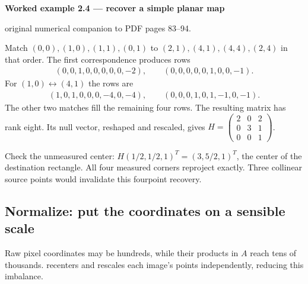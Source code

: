 \documentclass[letterpaper,11pt,english,openany,oneside]{jupyterBook}
\begin{document}
\label{\detokenize{lectures/lecture02/estimation:ex-lec02-dlt}}
\begin{TextbookBox}
\textbf{Worked example 2.4 — recover a simple planar map}\par\smallskip

\sphinxAtStartPar
{} original numerical companion to PDF pages 83–94.

\sphinxAtStartPar
Match \((0,0),(1,0),(1,1),(0,1)\) to \((2,1),(4,1),(4,4),(2,4)\) in that order. The first correspondence produces rows
\begin{equation*}
\begin{split}
(0,0,1,0,0,0,0,0,-2),\qquad
(0,0,0,0,0,1,0,0,-1).
\end{split}
\end{equation*}
\sphinxAtStartPar
For \((1,0)\leftrightarrow(4,1)\) the rows are
\begin{equation*}
\begin{split}
(1,0,1,0,0,0,-4,0,-4),\qquad
(0,0,0,1,0,1,-1,0,-1).
\end{split}
\end{equation*}
\sphinxAtStartPar
The other two matches fill the remaining four rows. The resulting matrix has rank eight. Its null vector, reshaped and rescaled, gives
\(H=\begin{pmatrix}2&0&2\\0&3&1\\0&0&1\end{pmatrix}\).

\sphinxAtStartPar
Check the unmeasured center: \(H(1/2,1/2,1)^T=(3,5/2,1)^T\), the center of the destination rectangle. All four measured corners reproject exactly. Three collinear source points would invalidate this four\sphinxhyphen{}point recovery.

\end{TextbookBox}


\subsection{Normalize: put the coordinates on a sensible scale}
\label{\detokenize{lectures/lecture02/estimation:normalize-put-the-coordinates-on-a-sensible-scale}}
\sphinxAtStartPar
Raw pixel coordinates may be hundreds, while their products in \(A\) reach tens of thousands.  recenters and rescales each image’s points independently, reducing this imbalance.
\end{document}
